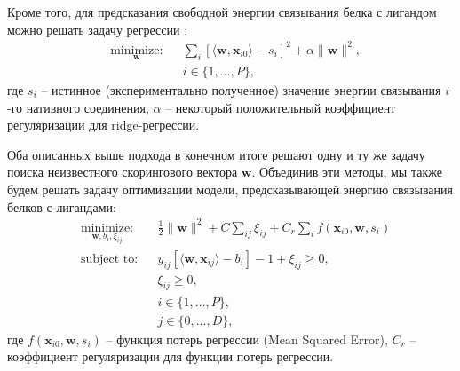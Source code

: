 \documentclass[preprint,12pt,3p]{elsarticle}
\begin{document}
Кроме того, для предсказания свободной энергии связывания белка с лигандом можно решать задачу регрессии \cite{regression}:
\begin{equation}\label{eq11}
\begin{aligned}
& \underset{\mathbf{w}}{\text{minimize:}}
& & \sum\limits_{i}[\langle\mathbf{w},\mathbf{x}_{i0}\rangle - s_i]^2 + \alpha\|\mathbf{w}\|^2, \\
&&& i\in\{1,\dots,P\},
\end{aligned}
\end{equation}
где $s_i$ -- истинное (экспериментально полученное) значение энергии связывания $i$-го нативного соединения, $\alpha$ -- некоторый положительный коэффициент регуляризации для ridge-регрессии. 

Оба описанных выше подхода в конечном итоге решают одну и ту же задачу поиска неизвестного скорингового вектора $\mathbf{w}$. Объединив эти методы, мы также будем решать задачу оптимизации модели, предсказывающей энергию связывания белков с лигандами:
\begin{equation}\label{eq12}
\begin{aligned}
& \underset{\mathbf{w}, b_i, \xi_{ij}}{\text{minimize:}}
& & \frac{1}{2} \|\mathbf{w}\|^2 + C\sum\limits_{ij}\xi_{ij} + C_{r}\sum\limits_{i} f(\mathbf{x}_{i0},\mathbf{w}, s_i) \\
& \text{subject to:}
& & y_{ij}[\langle\mathbf{w},\mathbf{x}_{ij}\rangle - b_i]-1+\xi_{ij} \geq 0, \\
&&& \xi_{ij} \geq 0, \\
&&&i\in\{1,\dots,P\}, \\
&&&j\in\{0,\dots,D\},
\end{aligned}
\end{equation}
где $f(\mathbf{x}_{i0},\mathbf{w}, s_i)$ -- функция потерь регрессии (Mean Squared Error), $C_r$ -- коэффициент регуляризации для функции потерь регрессии. 
\end{document}

